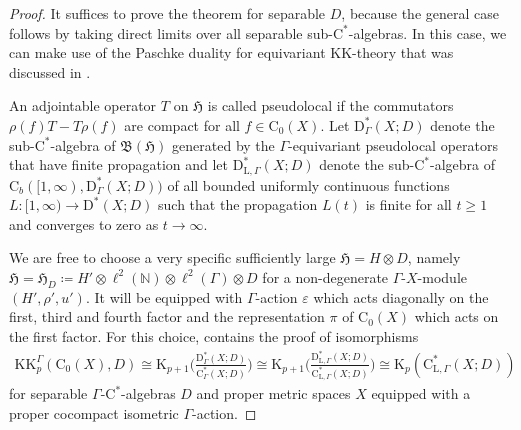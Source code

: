 \documentclass[pdftex]{sigma}
\numberwithin{equation}{section}
\theoremstyle{definition}
\newcommand{\N}{\mathbb{N}}
\newcommand{\Ct}{\mathrm{C}}
\newcommand{\Cz}{\Ct_0}
\newcommand{\Cb}{\Ct_b}
\newcommand{\HilbertMod}{\mathfrak{H}}
\newcommand{\K}{\mathrm{K}}
\newcommand{\KK}{\mathrm{KK}}
\newcommand{\textCstar}{\ensuremath{\mathrm{C}^*\!}}
\newcommand{\Roe}{\mathrm{C}^*}
\newcommand{\PseudoLoc}{\mathrm{D}^*}
\newcommand{\Loc}{\mathrm{C}^*_{\mathrm{L},\Gamma}}
\newcommand{\PseudoLocLoc}{\mathrm{D}^*_{\mathrm{L},\Gamma}}
\newcommand{\Lin}{{\mathfrak{B}}}
\begin{document}
\begin{proof}
It suffices to prove the theorem for separable $D$, because the general case follows by taking direct limits over all separable sub-\textCstar-algebras.
In this case, we can make use of the Paschke duality for equivariant $\KK$-theory that was discussed in \cite[Appendix~B]{GueWillYu_DyncomplKtheory}.

An adjointable operator $T$ on $\HilbertMod$ is called pseudolocal if the commutators $\rho(f)T-T\rho(f)$ are compact for all $f\in \Cz(X)$.
Let $\PseudoLoc_\Gamma(X;D)$ denote the sub-\textCstar-algebra of $\Lin(\HilbertMod)$ generated by the $\Gamma$-equivariant pseudolocal operators that have finite propagation and let $\PseudoLocLoc(X;D)$ denote the sub-\textCstar-algebra of $\Cb([1,\infty),\PseudoLoc_\Gamma(X;D))$ of all bounded uniformly continuous functions $L\colon[1,\infty)\to\PseudoLoc(X;D)$ such that the propagation $L(t)$ is finite for all $t\geq 1$ and converges to zero as $t\to\infty$.

We are free to choose a very specific sufficiently large $\HilbertMod=H\otimes D$, namely $\HilbertMod=\HilbertMod_D\coloneqq H'\otimes \ell^2(\N)\otimes\ell^2(\Gamma)\otimes D$ for a non-degenerate $\Gamma$-$X$-module $(H',\rho',u')$.
It will be equipped with $\Gamma$-action $\varepsilon$ which acts diagonally on the first, third and fourth factor and the representation $\pi$ of $\Cz(X)$ which acts on the first factor.
For this choice, \cite[Appendix B]{GueWillYu_DyncomplKtheory} contains the proof of isomorphisms
\begin{gather*}
\KK_p^\Gamma(\Cz(X),D)\cong\K_{p+1}\biggl(\frac{\PseudoLoc_\Gamma(X;D)}{\Roe_\Gamma(X;D)}\biggr) \cong\K_{p+1}\biggl(\frac{\PseudoLocLoc(X;D)}{\Loc(X;D)}\biggr)\cong\K_p(\Loc(X;D))
\end{gather*}
for separable $\Gamma$-\textCstar-algebras $D$ and proper metric spaces $X$ equipped with a proper cocompact isometric $\Gamma$-action.


\end{proof}
\end{document}
